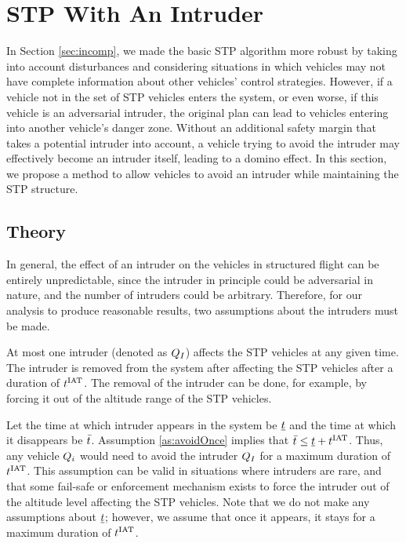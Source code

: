 \section{STP With An Intruder \label{sec:intruder}}
In Section \ref{sec:incomp}, we made the basic STP algorithm more robust by taking into account disturbances and considering situations in which vehicles may not have complete information about other vehicles' control strategies. However, if a vehicle not in the set of STP vehicles enters the system, or even worse, if this vehicle is an adversarial intruder, the original plan can lead to vehicles entering into another vehicle's danger zone. Without an additional safety margin that takes a potential intruder into account, a vehicle trying to avoid the intruder may effectively become an intruder itself, leading to a domino effect. In this section, we propose a method to allow vehicles to avoid an intruder while maintaining the STP structure.

\subsection{Theory}
In general, the effect of an intruder on the vehicles in structured flight can be entirely unpredictable, since the intruder in principle could be adversarial in nature, and the number of intruders could be arbitrary. Therefore, for our analysis to produce reasonable results, two assumptions about the intruders must be made.

\begin{assumption}
\label{as:avoidOnce}
At most one intruder (denoted as $Q_I$) affects the STP vehicles at any given time. The intruder is removed from the system after affecting the STP vehicles after a duration of $t^\text{IAT}$. The removal of the intruder can be done, for example, by forcing it out of the altitude range of the STP vehicles.
\end{assumption}

Let the time at which intruder appears in the system be $\underline{t}$ and the time at which it disappears be $\bar{t}$. Assumption \ref{as:avoidOnce} implies that $\bar{t} \leq \underline{t} + t^\text{IAT}$. Thus, any vehicle $Q_i$ would need to avoid the intruder $Q_{I}$ for a maximum duration of $t^\text{IAT}$. This assumption can be valid in situations where intruders are rare, and that some fail-safe or enforcement mechanism exists to force the intruder out of the altitude level affecting the STP vehicles. Note that we do not make any assumptions about $\underline{t}$; however, we assume that once it appears, it stays for a maximum duration of $t^\text{IAT}$.

